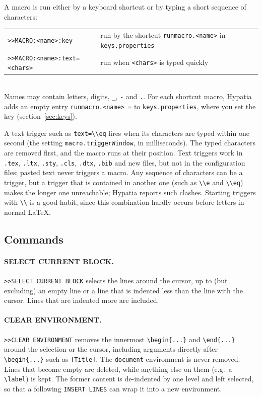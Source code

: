 \documentclass[11pt]{article}
\newcommand{\file}[1]{\texttt{#1}}
\begin{document}
    A macro is run either by a keyboard shortcut or by typing a short sequence of characters:\\[2mm]
    \hspace*{1cm}\begin{tabular}{ll}
        \verb+>>MACRO:<name>:key+ & run by the shortcut \verb+runmacro.<name>+ in \file{keys.properties}\\
        \verb+>>MACRO:<name>:text=<chars>+ & run when \verb+<chars>+ is typed quickly
    \end{tabular}\\[2mm]
    Names may contain letters, digits, \verb+_+, \verb+-+ and \verb+.+. For each shortcut macro, Hypatia adds an empty entry \verb+runmacro.<name> =+ to \file{keys.properties}, where you set the key (section~\ref{sec:keys}).

    A text trigger such as \verb+text=\\eq+ fires when its characters are typed within one second (the setting \verb+macro.triggerWindow+, in milliseconds). The typed characters are removed first, and the macro runs at their position. Text triggers work in \verb+.tex+, \verb+.ltx+, \verb+.sty+, \verb+.cls+, \verb+.dtx+, \verb+.bib+ and new files, but not in the configuration files; pasted text never triggers a macro. Any sequence of characters can be a trigger, but a trigger that is contained in another one (such as \verb+\\e+ and \verb+\\eq+) makes the longer one unreachable; Hypatia reports such clashes. Starting triggers with \verb+\\+ is a good habit, since this combination hardly occurs before letters in normal LaTeX.

    \subsection{Commands}

    \paragraph{SELECT CURRENT BLOCK.}
    \verb+>>SELECT CURRENT BLOCK+ selects the lines around the cursor, up to (but excluding) an empty line or a line that is indented less than the line with the cursor. Lines that are indented more are included.

    \paragraph{CLEAR ENVIRONMENT.}
    \verb+>>CLEAR ENVIRONMENT+ removes the innermost \verb+\begin{...}+ and \verb+\end{...}+ around the selection or the cursor, including arguments directly after \verb+\begin{...}+ such as \verb+[Title]+. The \verb+document+ environment is never removed. Lines that become empty are deleted, while anything else on them (e.g.\ a \verb+\label+) is kept. The former content is de-indented by one level and left selected, so that a following \verb+INSERT LINES+ can wrap it into a new environment.
\end{document}
